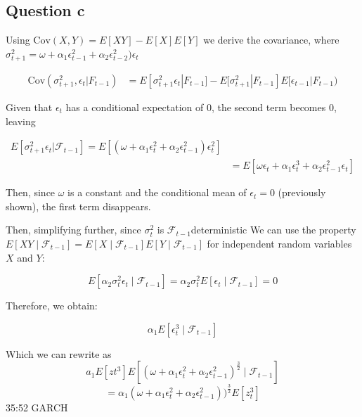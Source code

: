 \documentclass{article}
\begin{document}
\subsection*{Question c}

Using $\text{Cov} (X, Y) = E[XY] - E[X]E[Y]$ we derive the covariance, where $\sigma^2_{t+1} = \omega + \alpha_1 \epsilon_{t-1}^2 + \alpha_2 \epsilon^2_{t-2}) \epsilon_t$

\begin{align*}
\text{Cov}(\sigma^2_{t+1}, \epsilon_t | F_{t-1}) &= E[ \sigma^2_{t+1} \epsilon_t | F_{t-1}] - E[\sigma^2_{t+1}| F_{t-1} ] E[\epsilon_{t-1} | F_{t-1})
\end{align*}

Given that $\epsilon_t$ has a conditional expectation of 0, the second term becomes 0, leaving

\begin{align*}
E[ \sigma^2_{t+1} \epsilon_t | \ensuremath{\mathcal{F}}_{t-1}] = E \left[ \left( \omega + \alpha_1 \epsilon_t^2 + \alpha_2 \epsilon^2_{t-1} \right) \epsilon_t^2 \right] \\
&= E \left[  \omega \epsilon_t + \alpha_1 \epsilon_t^3 + \alpha_2 \epsilon^2_{t-1}  \epsilon_t  \right]
\end{align*}

Then,  since $\omega$ is a constant and the conditional mean of $\epsilon_t =0$ (previously shown), the first term disappears. 

Then, simplifying further, since $\sigma^2_{t}$ is $\ensuremath{\mathcal{F}}_{t-1}$deterministic 
We can use the property $E[XY \mid \mathcal{F}_{t-1}] = E[X \mid \mathcal{F}_{t-1}]E[Y \mid \mathcal{F}_{t-1}]$ for independent random variables $X$ and $Y$:

\begin{equation}
E[\alpha_2 \sigma_t^2 \epsilon_t \mid \mathcal{F}_{t-1}] = \alpha_2 \sigma_t^2 E[\epsilon_t \mid \mathcal{F}_{t-1}] = 0
\end{equation}

Therefore, we obtain:

\begin{equation}
\alpha_1 E[\epsilon_t^3 \mid \mathcal{F}_{t-1}]
\end{equation}

Which we can rewrite as
 \[
 a_1 E \left[ zt^3 \right] E \left[ ( \omega + \alpha_1 \epsilon_t^2 + \alpha_2 \epsilon^2_{t-1} )^\frac{3}{2} \mid \ensuremath{\mathcal{F}}_{t-1}  \right] 
 \] 
 \[
 = \alpha_1 \left( \omega + \alpha_1 \epsilon_t^2 + \alpha_2 \epsilon^2_{t-1} \right) )^{\frac{3}{2}} E \left[ z_{t}^3 \right]  
 \] 
35:52 GARCH
\end{document}
